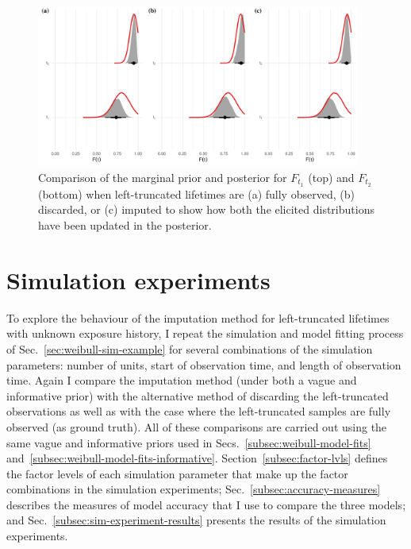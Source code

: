 \begin{figure}[tbp]
    \centering
    \includegraphics[width=0.95\textwidth]{./figures/ch-2/prior-post-comp.pdf}
    \caption{Comparison of the marginal prior and posterior for $F_{t_1}$ (top) and $F_{t_2}$ (bottom) when left-truncated lifetimes are (a) fully observed, (b) discarded, or (c) imputed to show how both the elicited distributions have been updated in the posterior.}
    \label{fig:weibull-prior-post-comp}
\end{figure}

\section{Simulation experiments} \label{sec:weibull-sim-study}

To explore the behaviour of the imputation method for left-truncated lifetimes with unknown exposure history, I repeat the simulation and model fitting process of Sec.~\ref{sec:weibull-sim-example} for several combinations of the simulation parameters: number of units, start of observation time, and length of observation time. Again I compare the imputation method (under both a vague and informative prior) with the alternative method of discarding the left-truncated observations as well as with the case where the left-truncated samples are fully observed (as ground truth). All of these comparisons are carried out using the same vague and informative priors used in Secs.~\ref{subsec:weibull-model-fits} and~\ref{subsec:weibull-model-fits-informative}. Section~\ref{subsec:factor-lvls} defines the factor levels of each simulation parameter that make up the factor combinations in the simulation experiments; Sec.~\ref{subsec:accuracy-measures} describes the measures of model accuracy that I use to compare the three models; and Sec.~\ref{subsec:sim-experiment-results} presents the results of the simulation experiments.

